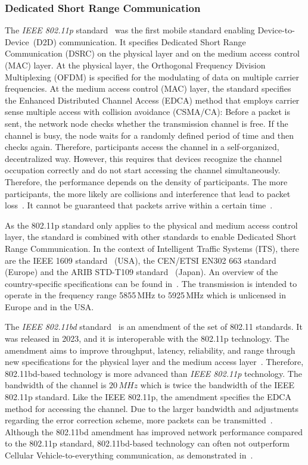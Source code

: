 \subsubsection{Dedicated Short Range Communication}

The \textit{IEEE 802.11p} standard~\cite{802.11p-2010-com} was the first mobile standard enabling Device-to-Device~(D2D) communication. It specifies Dedicated Short Range Communication (DSRC) on the physical layer and on the medium access control (MAC) layer. At the physical layer, the Orthogonal Frequency Division Multiplexing (OFDM) is specified for the modulating of data on multiple carrier frequencies.
At the medium access control (MAC) layer, the standard specifies the Enhanced Distributed Channel Access (EDCA) method that employs carrier sense multiple access with collision avoidance (CSMA/CA): Before a packet is sent, the network node checks whether the transmission channel is free. If the channel is busy, the node waits for a randomly defined period of time and then checks again.
Therefore, participants access the channel in a self-organized, decentralized way. However, this requires that devices recognize the channel occupation correctly and do not start accessing the channel simultaneously. Therefore, the performance depends on the density of participants. The more participants, the more likely are collisions and interference that lead to packet loss~\cite{shrestha-2020-com}. It cannot be guaranteed that packets arrive within a certain time~\cite{shrestha-2020-com}.

As the 802.11p standard only applies to the physical and medium access control layer, the standard is combined with other standards to enable Dedicated Short Range Communication. In the context of Intelligent Traffic Systems (ITS), there are the IEEE 1609 standard~\cite{ieee-2016-IEEEStd1609.4-com} (USA), the CEN/ETSI EN302 663 standard~\cite{etsi-2019-EN302663-com} (Europe) and the ARIB STD-T109 standard~\cite{its-2012-T109-com} (Japan). An overview of the country-specific specifications can be found in~\cite{costandoiu-2019-com}.
The transmission is intended to operate in the frequency range 5855\,MHz to 5925\,MHz which is unlicensed in Europe and in the USA. 

The \textit{IEEE 802.11bd} standard~\cite{ieee802.11bd-2022-com} is an amendment of the set of 802.11 standards. It was released in 2023, and it is interoperable with the 802.11p technology. The amendment aims to improve throughput, latency, reliability, and range through new specifications for the physical layer and the medium access layer~\cite{yacheur-2020-com}.  Therefore, 802.11bd-based technology is more advanced than \textit{IEEE 802.11p} technology. The bandwidth of the channel is $20\,MHz$ which is twice the bandwidth of the IEEE 802.11p standard. Like the IEEE 802.11p, the amendment specifies the EDCA method for accessing the channel. Due to the larger bandwidth and adjustments regarding the error correction scheme, more packets can be transmitted~\cite{yacheur-2020-com}. 
Although the 802.11bd amendment has improved network performance compared to the 802.11p standard, 802.11bd-based technology can often not outperform Cellular Vehicle-to-everything communication, as demonstrated in~\cite{anwar-2019-com}.


